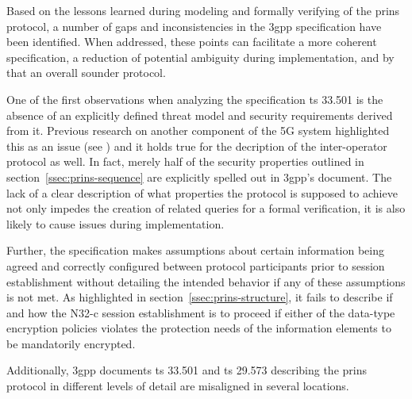 Based on the lessons learned during modeling and formally verifying of the \gls{prins} protocol, a number of gaps and inconsistencies in the \gls{3gpp} specification have been identified.
When addressed, these points can facilitate a more coherent specification, a reduction of potential ambiguity during implementation, and by that an overall sounder protocol.

One of the first observations when analyzing the specification \gls{ts} 33.501 is the absence of an explicitly defined threat model and security requirements derived from it.
Previous research on another component of the 5G system highlighted this as an issue (see \cite{basin2018model}) and it holds true for the decription of the inter-operator protocol as well.
In fact, merely half of the security properties outlined in section~\ref{ssec:prins-sequence} are explicitly spelled out in \gls{3gpp}'s document.
The lack of a clear description of what properties the protocol is supposed to achieve not only impedes the creation of related queries for a formal verification, it is also likely to cause issues during implementation.

Further, the specification makes assumptions about certain information being agreed and correctly configured between protocol participants prior to session establishment without detailing the intended behavior if any of these assumptions is not met.
As highlighted in section~\ref{ssec:prins-structure}, it fails to describe if and how the N32-c session establishment is to proceed if either of the data-type encryption policies violates the protection needs of the information elements to be mandatorily encrypted.

Additionally, \gls{3gpp} documents \gls{ts} 33.501 and \gls{ts} 29.573 describing the \gls{prins} protocol in different levels of detail are misaligned in several locations.

